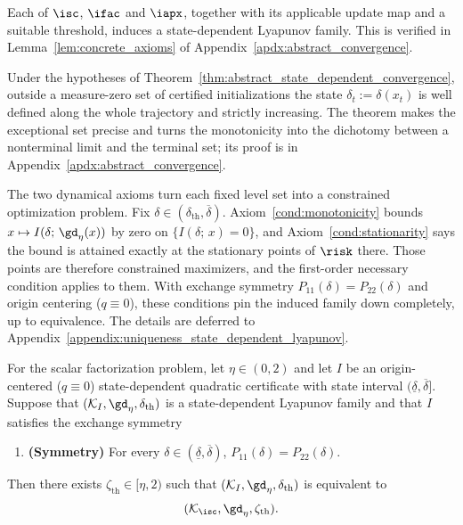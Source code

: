 \documentclass{article}
\begin{document}
Each of $\isc$, $\ifac$ and $\iapx$, together with its applicable update map
and a suitable threshold, induces a state-dependent Lyapunov family. This is
verified in Lemma~\ref{lem:concrete_axioms} of
Appendix~\ref{apdx:abstract_convergence}.

Under the hypotheses of Theorem~\ref{thm:abstract_state_dependent_convergence},
outside a measure-zero set of certified initializations the state
$\delta_t:=\delta(x_t)$ is well defined along the whole trajectory and strictly
increasing. The theorem makes the exceptional set precise and turns the
monotonicity into the dichotomy between a nonterminal limit and the terminal
set; its proof is in Appendix~\ref{apdx:abstract_convergence}.

The two dynamical axioms turn each fixed level set into a constrained
optimization problem. Fix $\delta\in(\delta_{\mathrm{th}},\overline\delta)$.
Axiom~\ref{cond:monotonicity} bounds $x\mapsto I(\delta;\,\gd_\eta(x))$ by zero
on $\{I(\delta;\,x)=0\}$, and Axiom~\ref{cond:stationarity} says the bound is
attained exactly at the stationary points of $\risk$ there. Those points are
therefore constrained maximizers, and the first-order necessary condition
applies to them. With exchange symmetry
$P_{11}(\delta)=P_{22}(\delta)$ and origin centering ($q\equiv0$), these
conditions pin the induced family down completely, up to equivalence.
The details are deferred to
Appendix~\ref{appendix:uniqueness_state_dependent_lyapunov}.

\begin{theorem}\label{thm:uniqueness_state_dependent_lyapunov}
For the scalar factorization problem, let $\eta \in (0,2)$ and let $I$ be an
origin-centered ($q\equiv0$) state-dependent quadratic certificate with state
interval $(\underline\delta,\overline\delta]$. Suppose that
$(\mathcal K_I,\gd_\eta,\delta_{\mathrm{th}})$ is a state-dependent Lyapunov
family and that $I$ satisfies the exchange symmetry
\begin{enumerate}[label=(A\arabic*), ref=A\arabic*, start=7]
\item \label{cond:symmetry}
\textbf{(Symmetry)} For every $\delta \in (\underline\delta, \overline\delta)$,
$P_{11}(\delta) = P_{22}(\delta)$.
\end{enumerate}
Then there exists $\zeta_{\mathrm{th}}\in[\eta,2)$ such that
$(\mathcal K_I,\gd_\eta,\delta_{\mathrm{th}})$ is equivalent to
\begin{align}
    (\mathcal K_{\isc},\gd_\eta,\zeta_{\mathrm{th}}).
\end{align}
\end{theorem}
\end{document}
